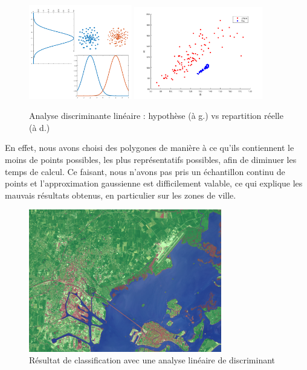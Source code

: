 \documentclass[a4paper,10pt]{report}
\begin{document}
\begin{figure}[H]
  \centering
    \includegraphics[width=0.4\textwidth]{ml_lda}\hfill
    \includegraphics[width=0.5\textwidth]{ml_ldaReel}
  \caption{Analyse discriminante linéaire : hypothèse (à g.) vs repartition réelle (à d.)}
  \label{fig:ml_lda}
\end{figure}

  En effet, nous avons choisi des polygones de manière à ce qu'ils contiennent le moins de points possibles, les plus représentatifs possibles, afin de diminuer les temps de calcul. Ce faisant, nous n'avons pas pris un échantillon continu de points et l'approximation gaussienne est difficilement valable, ce qui explique les mauvais résultats obtenus, en particulier sur les zones de ville.
\begin{figure}[H]
  \centering
    \includegraphics[width=0.75\textwidth]{venise+LDA}
  \caption{Résultat de classification avec une analyse linéaire de discriminant}
  \label{fig:veniseLDA}
\end{figure}
\end{document}
